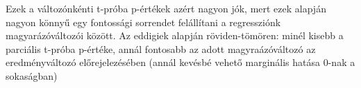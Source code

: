 \documentclass[
]{book}
\begin{document}
Ezek a változónkénti t-próba p-értékek azért nagyon jók, mert ezek alapján nagyon könnyű egy fontossági sorrendet felállítani a regressziónk magyarázóváltozói között. Az eddigiek alapján röviden-tömören: minél kisebb a parciális t-próba p-értéke, annál fontosabb az adott magyraázóváltozó az eredményváltozó előrejelezésében (annál kevésbé vehető marginális hatása \(0\)-nak a sokaságban)

  
\end{document}
